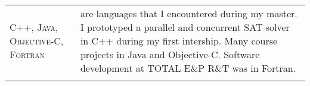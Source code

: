 \begin{tabular}{p{2cm}|p{11cm}}
\textsc{C++, \newline Java, Objective-C, Fortran} & are languages that I encountered during my master. \newline \footnotesize{I prototyped a parallel and concurrent SAT solver in C++ during my first intership. \newline Many course projects in Java and Objective-C. \newline Software development at \textsc{TOTAL E\&P R\&T} was in Fortran.}\\
\multicolumn{2}{c}{} \\

\end{tabular}